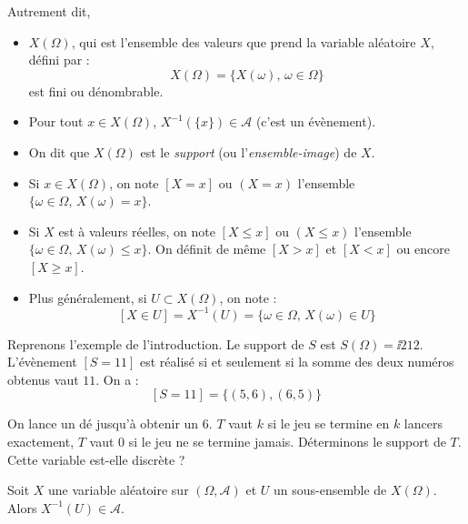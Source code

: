 \documentclass[french,11pt,twoside]{VcCours}
\begin{document}
Autrement dit,
\begin{itemize}
\item $X(\Omega)$, qui est l'ensemble des valeurs que prend la variable aléatoire $X$, défini par :
$$  X(\Omega) = \{X(\omega), \, \omega \in \Omega\} $$
est fini ou dénombrable.
\item Pour tout $x \in X(\Omega)$, $X^{-1}(\lbrace x \rbrace) \in \mathcal{A}$ (c'est un évènement).
\end{itemize}

\begin{Notation}{}
\begin{itemize}
  \item On dit que $X(\Omega)$ est le \emph{support} (ou l'\emph{ensemble-image}) de $X$.
  \item Si $x \in X(\Omega)$, on note $[X = x]$ ou $(X=x)$ l'ensemble $\lbrace \omega \in \Omega, \, X(\omega)=x \rbrace$.
  \item Si $X$ est à valeurs réelles, on note $[X \leq x]$ ou $(X \leq x)$ l'ensemble $\lbrace \omega \in \Omega, \, X(\omega) \leq x \rbrace$. On définit de même $[X>x]$ et $[X<x]$ ou encore $[X \geq x]$.
  \item Plus généralement, si $U \subset X(\Omega)$, on note :
  $$[X\in U] = X^{-1}(U)= \lbrace \omega \in \Omega, \, X(\omega) \in U \rbrace$$
\end{itemize}
\end{Notation}

\begin{Exemple}{} Reprenons l'exemple de l'introduction. Le support de $S$ est $S(\Omega) = \ii{2}{12}$. L'évènement $[S=11]$ est réalisé si et seulement si la somme des deux numéros obtenus vaut $11$. On a :
\[ [S=11] = \lbrace (5,6), (6,5) \rbrace\]
\end{Exemple}

\begin{Exemple}{} On lance un dé jusqu'à obtenir un 6. $T$ vaut $k$ si le jeu se termine en $k$ lancers exactement, $T$ vaut 0 si le jeu ne se termine jamais. Déterminons le support de $T$. Cette variable est-elle discrète ?

\vspace*{2cm}
\end{Exemple}

\begin{Proposition}{} Soit $X$ une variable aléatoire sur $(\Omega, \mathcal{A})$ et $U$ un sous-ensemble de $X(\Omega)$. Alors $X^{-1}(U) \in \mathcal{A}$.
\end{Proposition}
\end{document}
